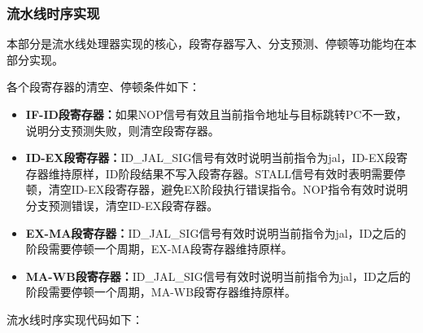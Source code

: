 \documentclass[UTF8]{ctexart}
\begin{document}
\subsubsection{流水线时序实现}
本部分是流水线处理器实现的核心，段寄存器写入、分支预测、停顿等功能均在本部分实现。\par
各个段寄存器的清空、停顿条件如下：
\begin{itemize}
    \item \textbf{IF-ID段寄存器：}如果NOP信号有效且当前指令地址与目标跳转PC不一致，说明分支预测失败，则清空段寄存器。
    \item \textbf{ID-EX段寄存器：}ID\_JAL\_SIG信号有效时说明当前指令为jal，ID-EX段寄存器维持原样，ID阶段结果不写入段寄存器。STALL信号有效时表明需要停顿，清空ID-EX段寄存器，避免EX阶段执行错误指令。NOP指令有效时说明分支预测错误，清空ID-EX段寄存器。
    \item \textbf{EX-MA段寄存器：}ID\_JAL\_SIG信号有效时说明当前指令为jal，ID之后的阶段需要停顿一个周期，EX-MA段寄存器维持原样。
    \item \textbf{MA-WB段寄存器：}ID\_JAL\_SIG信号有效时说明当前指令为jal，ID之后的阶段需要停顿一个周期，MA-WB段寄存器维持原样。
\end{itemize}\par
流水线时序实现代码如下：
\end{document}

